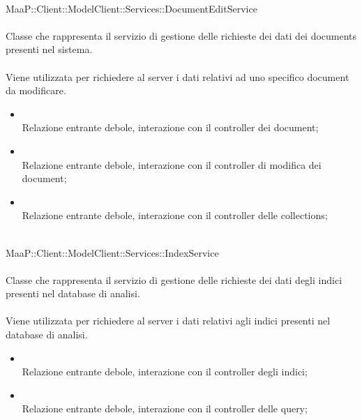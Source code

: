\\
MaaP::Client::ModelClient::Services::DocumentEditService\\
\\
Classe che rappresenta il servizio di gestione delle richieste dei dati dei documents presenti nel sistema.\\
\\
Viene utilizzata per richiedere al server i dati relativi ad uno specifico document da modificare.\\
\begin{itemize}
\item{}\\
Relazione entrante debole, interazione con il controller dei document;
\item{}\\
Relazione entrante debole, interazione con il controller di modifica dei document;
\item{}\\
Relazione entrante debole, interazione con il controller delle collections;
\end{itemize}

\\
MaaP::Client::ModelClient::Services::IndexService\\
\\
Classe che rappresenta il servizio di gestione delle richieste dei dati degli indici presenti nel database di analisi.\\
\\
Viene utilizzata per richiedere al server i dati relativi agli indici presenti nel database di analisi.\\
\begin{itemize}
\item{}\\
Relazione entrante debole, interazione con il controller degli indici;
\item{}\\
Relazione entrante debole, interazione con il controller delle query;
\end{itemize}

